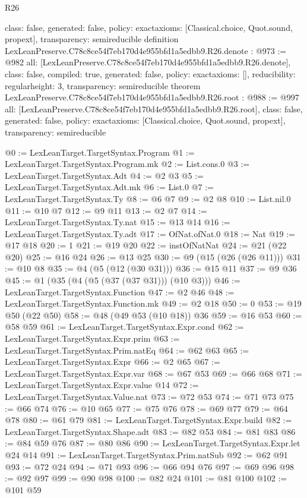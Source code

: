 \begin{lexlean}{R26}
\begin{coremodule}
{  class: false,
  generated: false,
  policy: exact{axioms: [Classical.choice, Quot.sound, propext]},
  transparency: semireducible
}
definition LexLeanPreserve.C78c8ce54f7eb170d4e955bfd1a5edbb9.R26.denote : @973 := @982 {
  all: [LexLeanPreserve.C78c8ce54f7eb170d4e955bfd1a5edbb9.R26.denote],
  class: false,
  compiled: true,
  generated: false,
  policy: exact{axioms: []},
  reducibility: regular{height: 3},
  transparency: semireducible
}
theorem LexLeanPreserve.C78c8ce54f7eb170d4e955bfd1a5edbb9.R26.root : @988 := @997 {
  all: [LexLeanPreserve.C78c8ce54f7eb170d4e955bfd1a5edbb9.R26.root],
  class: false,
  generated: false,
  policy: exact{axioms: [Classical.choice, Quot.sound, propext]},
  transparency: semireducible
}

@0 := LexLeanTarget.TargetSyntax.Program
@1 := LexLeanTarget.TargetSyntax.Program.mk
@2 := List.cons.{0}
@3 := LexLeanTarget.TargetSyntax.Adt
@4 := @2 @3
@5 := LexLeanTarget.TargetSyntax.Adt.mk
@6 := List.{0}
@7 := LexLeanTarget.TargetSyntax.Ty
@8 := @6 @7
@9 := @2 @8
@10 := List.nil.{0}
@11 := @10 @7
@12 := @9 @11
@13 := @2 @7
@14 := LexLeanTarget.TargetSyntax.Ty.nat
@15 := @13 @14
@16 := LexLeanTarget.TargetSyntax.Ty.adt
@17 := OfNat.ofNat.{0}
@18 := Nat
@19 := @17 @18
@20 := 1
@21 := @19 @20
@22 := instOfNatNat
@24 := @21 (@22 @20)
@25 := @16 @24
@26 := @13 @25
@30 := @9 (@15 (@26 (@26 @11)))
@31 := @10 @8
@35 := @4 (@5 (@12 (@30 @31)))
@36 := @15 @11
@37 := @9 @36
@45 := @1 (@35 (@4 (@5 (@37 (@37 @31))) (@10 @3)))
@46 := LexLeanTarget.TargetSyntax.Function
@47 := @2 @46
@48 := LexLeanTarget.TargetSyntax.Function.mk
@49 := @2 @18
@50 := 0
@53 := @19 @50 (@22 @50)
@58 := @48 (@49 @53 (@10 @18)) @36
@59 := @16 @53
@60 := @58 @59
@61 := LexLeanTarget.TargetSyntax.Expr.cond
@62 := LexLeanTarget.TargetSyntax.Expr.prim
@63 := LexLeanTarget.TargetSyntax.Prim.natEq
@64 := @62 @63
@65 := LexLeanTarget.TargetSyntax.Expr
@66 := @2 @65
@67 := LexLeanTarget.TargetSyntax.Expr.var
@68 := @67 @53
@69 := @66 @68
@71 := LexLeanTarget.TargetSyntax.Expr.value @14
@72 := LexLeanTarget.TargetSyntax.Value.nat
@73 := @72 @53
@74 := @71 @73
@75 := @66 @74
@76 := @10 @65
@77 := @75 @76
@78 := @69 @77
@79 := @64 @78
@80 := @61 @79
@81 := LexLeanTarget.TargetSyntax.Expr.build
@82 := LexLeanTarget.TargetSyntax.Shape.adt
@83 := @82 @53
@84 := @81 @83
@86 := @84 @59 @76
@87 := @80 @86
@90 := LexLeanTarget.TargetSyntax.Expr.let @24 @14
@91 := LexLeanTarget.TargetSyntax.Prim.natSub
@92 := @62 @91
@93 := @72 @24
@94 := @71 @93
@96 := @66 @94 @76
@97 := @69 @96
@98 := @92 @97
@99 := @90 @98
@100 := @82 @24
@101 := @81 @100
@102 := @101 @59

\end{coremodule}
\end{lexlean}
